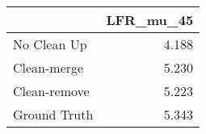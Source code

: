 \begin{tabular}{lr}
\toprule
{} & LFR_mu_45 \\
\midrule
No Clean Up  &     4.188 \\
Clean-merge  &     5.230 \\
Clean-remove &     5.223 \\
Ground Truth &     5.343 \\
\bottomrule
\end{tabular}
